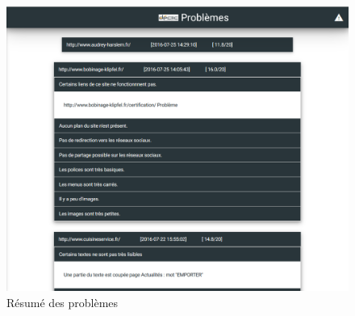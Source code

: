 \documentclass[report]{tnreport}
\begin{document}
\begin{figure}[h]
  \centering
  \includegraphics[width=18cm]{figures/problems}
  \caption{Résumé des problèmes}
  \label{fig:problems}
\end{figure}
\end{document}
